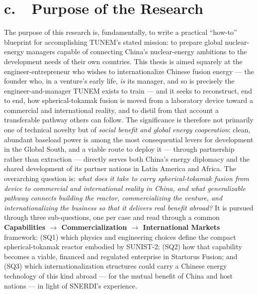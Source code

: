 \documentclass[11pt]{article}
\begin{document}
\bigskip

\section*{c.~~Purpose of the Research}
The purpose of this research is, fundamentally, to write a practical ``how-to'' blueprint for accomplishing TUNEM's stated mission: to prepare global nuclear-energy managers capable of connecting China's nuclear-energy ambitions to the development needs of their own countries. This thesis is aimed squarely at the engineer-entrepreneur who wishes to internationalize Chinese fusion energy --- the founder who, in a venture's early life, \emph{is} its manager, and so is precisely the engineer-and-manager TUNEM exists to train --- and it seeks to reconstruct, end to end, how spherical-tokamak fusion is moved from a laboratory device toward a commercial and international reality, and to distil from that account a transferable pathway others can follow. The significance is therefore not primarily one of technical novelty but of \emph{social benefit and global energy cooperation}: clean, abundant baseload power is among the most consequential levers for development in the Global South, and a viable route to deploy it --- through partnership rather than extraction --- directly serves both China's energy diplomacy and the shared development of its partner nations in Latin America and Africa. The overarching question is: \emph{what does it take to carry spherical-tokamak fusion from device to commercial and international reality in China, and what generalizable pathway connects building the reactor, commercializing the venture, and internationalizing the business so that it delivers real benefit abroad?} It is pursued through three sub-questions, one per case and read through a common \textbf{Capabilities $\rightarrow$ Commercialization $\rightarrow$ International Markets} framework: (SQ1) which physics and engineering choices define the compact spherical-tokamak reactor embodied by SUNIST-2; (SQ2) how that capability becomes a viable, financed and regulated enterprise in Startorus Fusion; and (SQ3) which internationalization structures could carry a Chinese energy technology of this kind abroad --- for the mutual benefit of China and host nations --- in light of SNERDI's experience.
\end{document}
